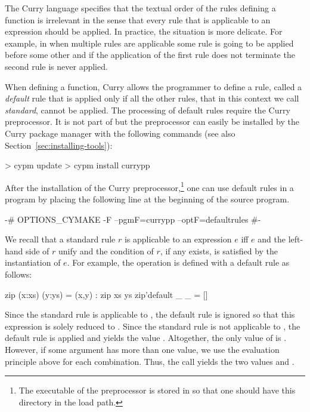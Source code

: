 The Curry language specifies that the textual order of the rules
defining a function is irrelevant in the sense that every rule that is
applicable to an expression should be applied.
In practice, the situation is more delicate.
For example, in \pakcs{} when multiple rules are applicable
some rule is going to be applied before some other
and if the application of the first rule
does not terminate the second rule is never applied.

When defining a function,
Curry allows the programmer to define a rule, called
a \emph{default} rule
\cite{AntoyHanus17TPLP}
that is applied only if all the other rules,
that in this context we call \emph{standard}, cannot be applied.
The processing of default rules require the Curry preprocessor.
It is not part of \pakcs but the preprocessor can easily be installed
by the Curry package manager with the following commands
(see also Section~\ref{sec:installing-tools}):
%
\begin{curry}
> cypm update
> cypm install currypp
\end{curry}
%
After the installation of the Curry preprocessor,\footnote{%
The executable  of the preprocessor is stored in
 so that one should have this directory
in the load path.}
one can use default rules in a program by placing the following
line at the beginning of the source program.
%
\begin{curry}
{-# OPTIONS_CYMAKE -F --pgmF=currypp --optF=defaultrules #-}  
\end{curry}
%
We recall that a standard rule $r$ is applicable to an expression
$e$ iff $e$ and the left-hand side of $r$ unify and the condition
of $r$, if any exists, is satisfied by the instantiation of $e$.
For example, the operation 
is defined with a default rule as follows:
%
\begin{curry}
zip (x:xs) (y:ys) = (x,y) : zip xs ys
zip'default _ _ = []
\end{curry}
%
Since the standard rule is applicable to , the
default rule is ignored so that this expression is solely reduced to
. Since the standard rule is not applicable to
, the default rule is applied and yields the value \code{[]}.
Altogether, the only value of  is \code{[(1,2)]}.
However, if
some argument has more than one value, we use the evaluation principle
above for each combination.  Thus, the call  yields
the two values \code{[(1,2)]} and \code{[]}.

